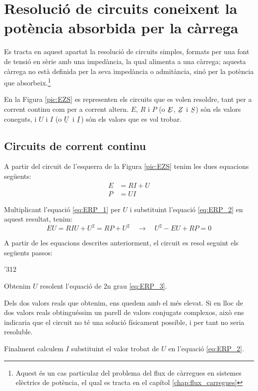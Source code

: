 \section{Resolució de circuits coneixent la potència absorbida per la
càrrega}\label{sec:EZS}

Es tracta en aquest apartat la resolució de circuits simples,
formats per una font de tensió en sèrie amb una impedància, la qual
alimenta a una càrrega; aquesta càrrega no està definida per la seva
impedància o admitància, sinó per la potència que absorbeix.\footnote{Aquest és un cas particular
del problema del flux de càrregues en
sistemes elèctrics de potència, el qual es tracta en el capítol \ref{chap:flux_carregues}}

En la Figura \vref{pic:EZS} es representen els circuits que es volen
resoldre, tant per a corrent continu com per a corrent altern. $E$,
$R$ i $P$ (o $\cmplx{E}$, $\cmplx{Z}$ i $\cmplx{S}$) són els valors
coneguts, i $U$ i $I$ (o $\cmplx{U}$ i $\cmplx{I}$) són els valors
que es vol trobar.

\begin{center}
   
     \label{pic:EZS}
\end{center}

\subsection{Circuits de corrent continu}

A partir del circuit de l'esquerra de la Figura \vref{pic:EZS} tenim les dues equacions següents:
\begin{align}
   E &= R I + U \label{eq:ERP_1} \\
   P &= U I     \label{eq:ERP_2}
\end{align}

Multiplicant l'equació \eqref{eq:ERP_1} per $U$ i substituint l'equació \eqref{eq:ERP_2} en aquest resultat, tenim:
\begin{equation}
   E U = R I U + U^2 = R P + U^2 \quad \rightarrow \quad U^2 - E U + R P = 0 \label{eq:ERP_3}
\end{equation}

A partir de les equacions descrites anteriorment, el circuit es resol seguint els següents passos:
\begin{dingautolist}{'312}
   \item Obtenim $U$ resolent l'equació de 2n grau \eqref{eq:ERP_3}.
   \item Dels dos valors reals que obtenim, ens quedem amb el més elevat. Si en lloc de dos valors reals obtinguéssim
   un parell de valors conjugats complexos, això ens indicaria que el circuit no té una solució físicament possible, i per tant no seria resoluble.
   \item Finalment calculem $I$ substituint el valor trobat de $U$ en l'equació \eqref{eq:ERP_2}.
\end{dingautolist}

